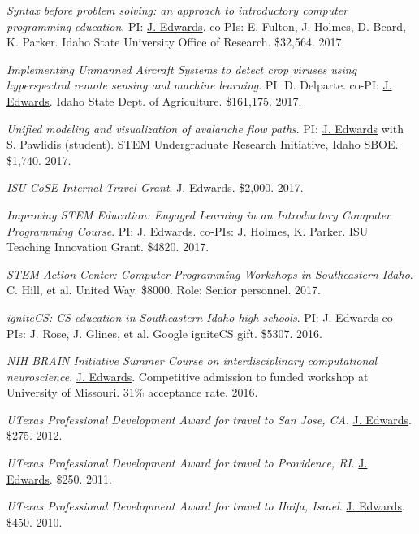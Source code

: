 \documentclass[margin,line]{res}
\begin{document}
\begin{resume}
\textit{Syntax before problem solving: an approach to introductory computer programming education}. PI: \underline{J. Edwards}. co-PIs: E. Fulton, J. Holmes, D. Beard, K. Parker. Idaho State University Office of Research. \$32,564. 2017.

\textit{Implementing Unmanned Aircraft Systems to detect crop viruses using hyperspectral remote sensing and machine learning}. PI: D. Delparte. co-PI: \underline{J. Edwards}. Idaho State Dept. of Agriculture. \$161,175. 2017.

\textit{Unified modeling and visualization of avalanche flow paths}. PI: \underline{J. Edwards} with S. Pawlidis (student). STEM Undergraduate Research Initiative, Idaho SBOE. \$1,740. 2017.

\textit{ISU CoSE Internal Travel Grant}. \underline{J. Edwards}. \$2,000. 2017.

\textit{Improving STEM Education: Engaged Learning in an Introductory  Computer Programming Course}. PI: \underline{J. Edwards}. co-PIs: J. Holmes, K. Parker. ISU Teaching Innovation Grant. \$4820. 2017.

\textit{STEM Action Center: Computer Programming Workshops in Southeastern Idaho}. C. Hill, et al. United Way. \$8000. Role: Senior personnel. 2017.

\textit{igniteCS: CS education in Southeastern Idaho high schools}. PI: \underline{J. Edwards} co-PIs: J. Rose, J. Glines, et al. Google igniteCS gift. \$5307. 2016.

\textit{NIH BRAIN Initiative Summer Course on interdisciplinary computational neuroscience}. \underline{J. Edwards}. Competitive admission to funded workshop at University of Missouri. 31\% acceptance rate. 2016. %

\textit{UTexas Professional Development Award for travel to San Jose, CA}. \underline{J. Edwards}. \$275. 2012. %

\textit{UTexas Professional Development Award for travel to Providence, RI}. \underline{J. Edwards}. \$250. 2011. %

\textit{UTexas Professional Development Award for travel to Haifa, Israel}. \underline{J. Edwards}. \$450. 2010. %



\end{resume}
\end{document}
